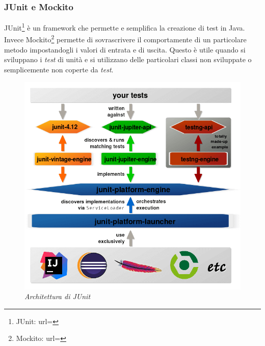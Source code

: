 \subsubsection{JUnit e Mockito}
JUnit\footnote{JUnit: url= } è un \gls{framework} che permette e semplifica la creazione di test in Java. Invece Mockito\footnote{Mockito: url= } permette di sovrascrivere il comportamente di un particolare metodo impostandogli i valori di entrata e di uscita. Questo è utile quando si sviluppano i \textit{test} di unità e si utilizzano delle particolari classi non sviluppate o semplicemente non coperte da \textit{test}.
\newpage
\begin{figure}[h!]
	\centering
	\includegraphics[scale=0.27]{immagini/junit.png}
	
	\caption{\textit{Architettura di JUnit }}
\end{figure}




